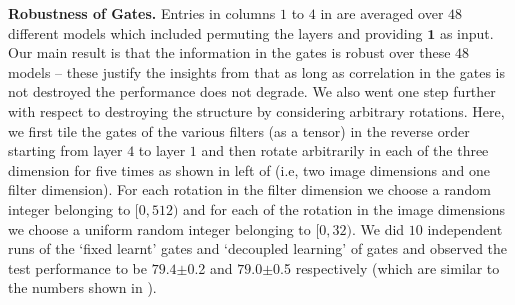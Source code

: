 \textbf{Robustness of Gates.} Entries in columns $1$ to $4$ in  are  averaged over $48$ different models which included  permuting the layers and providing $\mathbf{1}$ as input. Our main result is that the information in the gates is robust over these $48$ models -- these justify the insights from  that as long as correlation in the gates is not destroyed the performance does not degrade. We also went one step further with respect to destroying the structure by considering arbitrary rotations. Here, we first tile the gates of the various filters (as a tensor) in the reverse order starting from layer $4$ to layer $1$ and then rotate arbitrarily in each of the three dimension for five times as shown in left of  (i.e, two image dimensions and one filter dimension). For each rotation in the filter dimension we choose a random integer belonging to  $[0,512)$ and for each of the rotation in the image dimensions we choose a uniform random integer belonging to $[0,32)$. We did $10$ independent runs of the `fixed learnt' gates and `decoupled learning' of gates and observed the test performance to be $79.4${\tiny$\pm$0.2} and $79.0${\tiny$\pm$0.5} respectively (which are similar to the numbers shown in ).

